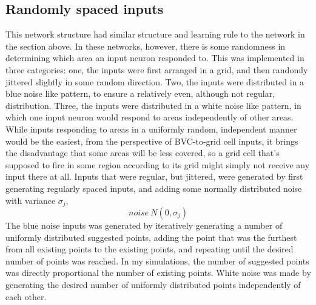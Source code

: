\documentclass{article}
\begin{document}
    \subsection{Randomly spaced inputs}
    This network structure had similar structure and learning rule to the network in the section above. In these networks, however, there is some randomness in determining which area an input neuron responded to. This was implemented in three categories: one, the inputs were first arranged in a grid, and then randomly jittered slightly in some random direction. Two, the inputs were distributed in a blue noise like pattern, to ensure a relatively even, although not regular, distribution. Three, the inputs were distributed in a white noise like pattern, in which one input neuron would respond to areas independently of other areas.
    While inputs responding to areas in a uniformly random, independent manner would be the easiest, from the perspective of BVC-to-grid cell inputs, it brings the disadvantage that some areas will be less covered, so a grid cell that's supposed to fire in some region according to its grid might simply not receive any input there at all.
    Inputs that were regular, but jittered, were generated by first generating regularly spaced inputs, and adding some normally distributed noise with variance \(\sigma_j\), \[noise ~ N(0, \sigma_j)\]
    The blue noise inputs was generated by iteratively generating a number of uniformly distributed suggested points, adding the point that was the furthest from all existing points to the existing points, and repeating until the desired number of points was reached. In my simulations, the number of suggested points was directly proportional the number of existing points.
    White noise was made by generating the desired number of uniformly distributed points independently of each other.
\end{document}
